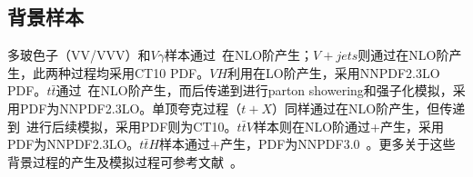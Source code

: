 \subsection{背景样本}
多玻色子（VV/VVV）和$V\gamma$样本通过~\cite{sherpa}在NLO阶产生；$V+jets$则通过在NLO阶产生，此两种过程均采用CT10 PDF。$VH$利用在LO阶产生，采用NNPDF2.3LO PDF。$t\bar{t}$通过~\cite{powhegbox}在NLO阶产生，而后传递到进行parton showering和强子化模拟，采用PDF为NNPDF2.3LO。单顶夸克过程（$t+X$）同样通过在NLO阶产生，但传递到~\cite{pythia6}进行后续模拟，采用PDF则为CT10。$t\bar{t}V$样本则在NLO阶通过\MGMCatNLO+产生，采用PDF为NNPDF2.3LO。$t\bar{t}H$样本通过\MGMCatNLO+\Herwigpp 产生，PDF为NNPDF3.0~\cite{PDF:NNPDF30}。更多关于这些背景过程的产生及模拟过程可参考文献~\cite{ATL-PHYS-PUB-2016-004,ATL-PHYS-PUB-2016-005,ATL-PHYS-PUB-2016-002}。

